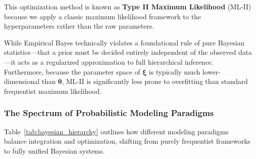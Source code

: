 \documentclass{article}
\begin{document}
This optimization method is known as \textbf{Type II Maximum Likelihood} (ML-II) because we apply a classic maximum likelihood framework to the hyperparameters rather than the raw parameters. 

While Empirical Bayes technically violates a foundational rule of pure Bayesian statistics—that a prior must be decided entirely independent of the observed data—it acts as a regularized approximation to full hierarchical inference. Furthermore, because the parameter space of $\boldsymbol{\xi}$ is typically much lower-dimensional than $\boldsymbol{\theta}$, ML-II is significantly less prone to overfitting than standard frequentist maximum likelihood.

\subsubsection{The Spectrum of Probabilistic Modeling Paradigms}
Table~\ref{tab:bayesian_hierarchy} outlines how different modeling paradigms balance integration and optimization, shifting from purely frequentist frameworks to fully unified Bayesian systems.

\begin{table}[htbp]
\centering
\small
{}
\caption{Foundational Spectrum of Optimization and Integration in Probabilistic Modeling}
\label{tab:bayesian_hierarchy}
\end{table}
\end{document}

